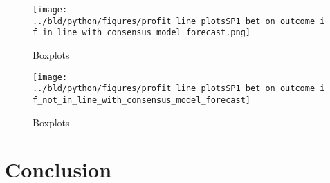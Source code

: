 \documentclass[11pt, a4paper, leqno]{article}
\begin{document}
\begin{figure}[H]
    \centering
    \texttt{[image: ../bld/python/figures/profit\_line\_plotsSP1\_bet\_on\_outcome\_if\_in\_line\_with\_consensus\_model\_forecast.png]}
    \caption{Boxplots}
    \label{fig:figure2}
\end{figure}
\begin{figure}[H]
    \centering
    \texttt{[image: ../bld/python/figures/profit\_line\_plotsSP1\_bet\_on\_outcome\_if\_not\_in\_line\_with\_consensus\_model\_forecast]}
    \caption{Boxplots}
    \label{fig:figure2}
\end{figure}




\section{Conclusion}







\end{document}
